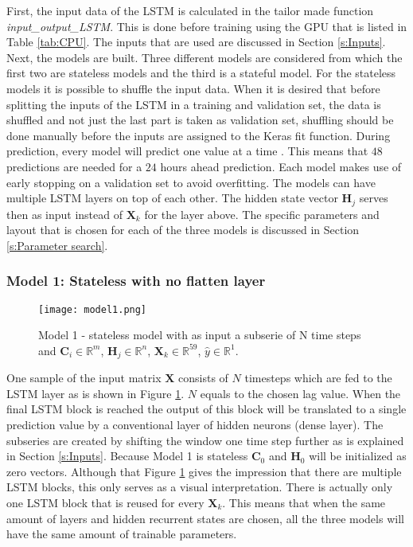 First, the input data of the LSTM is calculated in the tailor made function \textit{input\_output\_LSTM}. This is done before training using the GPU that is listed in Table \ref{tab:CPU}. The inputs that are used are discussed in Section \ref{s:Inputs}. Next, the models are built. Three different models are considered from which the first two are stateless models and the third is a stateful model. For the stateless models it is possible to shuffle the input data. When it is desired that before splitting the inputs of the LSTM in a training and validation set, the data is shuffled and not just the last part is taken as validation set, shuffling should be done manually before the inputs are assigned to the Keras fit function. During prediction, every model will predict one value at a time \cite{ANNRNN}. This means that $ 48 $ predictions are needed for a $ 24 $ hours ahead prediction. Each model makes use of early stopping on a validation set to avoid overfitting. The models can have multiple LSTM layers on top of each other. The hidden state vector $ \bm{H}_{j} $ serves then as input instead of $ \bm{X}_{k} $ for the layer above. The specific parameters and layout that is chosen for each of the three models is discussed in Section \ref{s:Parameter search}.

\subsubsection{Model 1: Stateless with no flatten layer}\label{s:Model1}

\begin{figure}[h]
	\centering
	\texttt{[image: model1.png]}
	\caption{Model 1 - stateless model with as input a subserie of N time steps and $ \bm{C}_{i} \in \mathbb{R}^{m} $, $ \bm{H}_{j} \in \mathbb{R}^{n} $, $ \bm{X}_{k} \in \mathbb{R}^{59} $, $ \hat{y} \in \mathbb{R}^{1} $.}
	\label{fig:model1}
\end{figure}

One sample of the input matrix $ \bm{X} $ consists of $ N $ timesteps which are fed to the LSTM layer as is shown in Figure \ref{fig:model1}. $ N $ equals to the chosen lag value. When the final LSTM block is reached the output of this block will be translated to a single prediction value by a conventional layer of hidden neurons (dense layer). The subseries are created by shifting the window one time step further as is explained in Section \ref{s:Inputs}. Because Model 1 is stateless $ \bm{C}_{0} $ and $ \bm{H}_{0} $ will be initialized as zero vectors. Although that Figure \ref{fig:model1} gives the impression that there are multiple LSTM blocks, this only serves as a visual interpretation. There is actually only one LSTM block that is reused for every $ \bm{X}_{k} $. This means that when the same amount of layers and hidden recurrent states are chosen, all the three models will have the same amount of trainable parameters. 


